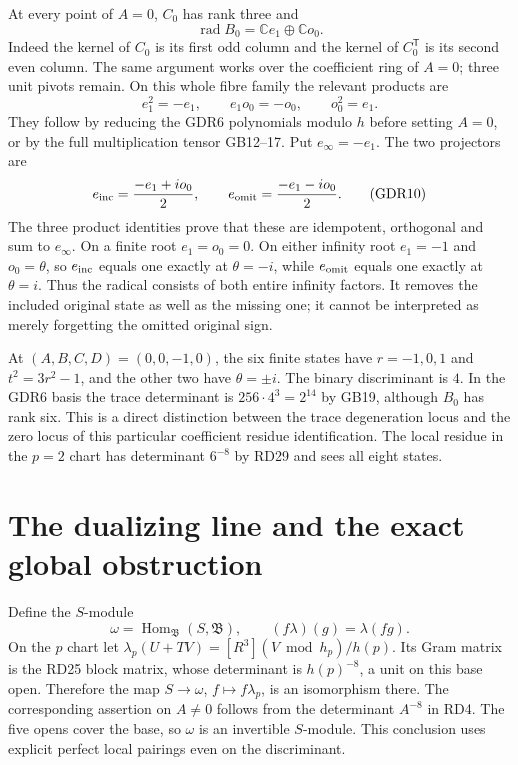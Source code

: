 \documentclass[11pt]{article}
\newcommand{\C}{\mathbb C}
\providecommand{\Hom}{\operatorname{Hom}}
\begin{document}
At every point of $A=0$, $C_0$ has rank three and
\begin{equation}
 \operatorname{rad}B_0=\C e_1\oplus\C o_0.
 \tag{GDR9}
\end{equation}
Indeed the kernel of $C_0$ is its first odd column and the
kernel of $C_0^{\mathsf T}$ is its second even column.
The same argument works over the coefficient ring of $A=0$;
three unit pivots remain. On this whole fibre family the
relevant products are
\[
 e_1^2=-e_1,\qquad e_1o_0=-o_0,\qquad o_0^2=e_1.
\]
They follow by reducing the GDR6 polynomials modulo $h$
before setting $A=0$, or by the full multiplication tensor
GB12--17. Put $e_\infty=-e_1$. The two projectors are
\begin{equation}
 e_{\rm inc}=\frac{-e_1+i o_0}{2},\qquad
 e_{\rm omit}=\frac{-e_1-i o_0}{2}.
 \tag{GDR10}
\end{equation}
The three product identities prove that these are idempotent,
orthogonal and sum to $e_\infty$. On a finite root $e_1=o_0=0$.
On either infinity root $e_1=-1$ and $o_0=\theta$, so
$e_{\rm inc}$ equals one exactly at $\theta=-i$, while
$e_{\rm omit}$ equals one exactly at $\theta=i$.
Thus the radical consists of both entire infinity factors.
It removes the included original state as well as the missing
one; it cannot be interpreted as merely forgetting the omitted
original sign.

At $(A,B,C,D)=(0,0,-1,0)$, the six finite states have
$r=-1,0,1$ and $t^2=3r^2-1$, and the other two have
$\theta=\pm i$. The binary discriminant is $4$.
In the GDR6 basis the trace determinant is
$256\cdot4^3=2^{14}$ by GB19, although $B_0$ has rank six.
This is a direct distinction between the trace degeneration
locus and the zero locus of this particular coefficient
residue identification. The local residue in the $p=2$ chart
has determinant $6^{-8}$ by RD29 and sees all eight states.

\section{The dualizing line and the exact global obstruction}
Define the $S$-module
\begin{equation}
 \omega=\Hom_{\mathfrak B}(S,\mathfrak B),\qquad
 (f\lambda)(g)=\lambda(fg).
 \tag{GDR11}
\end{equation}
On the $p$ chart let
$\lambda_p(U+TV)=[R^3](V\bmod h_p)/h(p)$.
Its Gram matrix is the RD25 block matrix, whose determinant
is $h(p)^{-8}$, a unit on this base open. Therefore the map
$S\to\omega$, $f\mapsto f\lambda_p$, is an isomorphism
there. The corresponding assertion on $A\ne0$ follows from
the determinant $A^{-8}$ in RD4. The five opens cover the
base, so $\omega$ is an invertible $S$-module. This conclusion
uses explicit perfect local pairings even on the discriminant.
\end{document}
